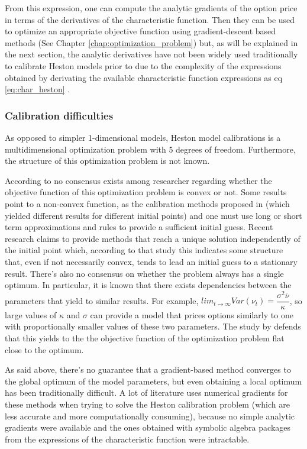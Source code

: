 \documentclass[12,twoside]{mammeTFM}
\theoremstyle{definition}
\theoremstyle{remark}
\begin{document}
From this expression, one can compute the analytic gradients of the option price in terms of the derivatives of the characteristic function. Then they can be used to optimize an appropriate objective function using gradient-descent based methods (See Chapter \ref{chap:optimization_problem}) but, as will be explained in the next section, the analytic derivatives have not been widely used traditionally to calibrate Heston models prior to \cite{cui17} due to the complexity of the expressions obtained by derivating the available characteristic function expressions as eq \ref{eq:char_heston}  \cite{cui17}.

\subsubsection{Calibration difficulties} \label{subsec:calibration_difficulties}
As opposed to simpler 1-dimensional models, Heston model calibrations is a multidimensional optimization problem with 5 degrees of freedom. Furthermore, the structure of this optimization problem is not known.

According to \cite{cui17} no consensus exists among researcher regarding whether the objective function of this optimization problem is convex or not. Some results point to a non-convex function, as the calibration methods proposed in \cite{che07, mik03} (which yielded different results for different initial points) and one must use long or short term approximations and rules to provide a sufficient initial guess. Recent research claims to provide methods that reach a unique solution independently of the initial point \cite{ger12} which, according to that study this indicates some structure that, even if not necessarily convex, tends to lead an initial guess to a stationary result.
There's also no consensus on whether the problem always has a single  optimum. In particular, it is known that there exists dependencies between the parameters that yield to similar results. For example, $lim_{t \rightarrow \infty} Var(\nu_t) = \dfrac{\sigma^2 \overline{\nu}}{\kappa}$, so large values of $\kappa$ and $\sigma$ can provide a model that prices options similarly to one with proportionally smaller values of these two parameters. The study by \cite{cui17} defends that this yields to the the objective function of the optimization problem flat close to the optimum.

As said above, there's no guarantee that a gradient-based method converges to the global optimum of the model parameters, but even obtaining a local optimum has been traditionally difficult. A lot of literature uses numerical gradients\cite{ger12} for these methods when trying to solve the Heston calibration problem (which are less accurate and more computationally consuming), because no simple analytic gradients were available and the ones obtained with symbolic algebra packages from the expressions of the characteristic function were intractable.
\end{document}
